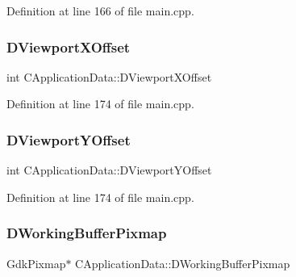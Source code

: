 Definition at line 166 of file main.\+cpp.

\hypertarget{classCApplicationData_a306bba873ccc47126111305fe21ef3ff}{}\label{classCApplicationData_a306bba873ccc47126111305fe21ef3ff} 
\subsubsection{\texorpdfstring{D\+Viewport\+X\+Offset}{DViewportXOffset}}
{\footnotesize\ttfamily int C\+Application\+Data\+::\+D\+Viewport\+X\+Offset\hspace{0.3cm}{\ttfamily [protected]}}



Definition at line 174 of file main.\+cpp.

\hypertarget{classCApplicationData_afc58ed96a1af813b28f6abf2c7d2dc72}{}\label{classCApplicationData_afc58ed96a1af813b28f6abf2c7d2dc72} 
\subsubsection{\texorpdfstring{D\+Viewport\+Y\+Offset}{DViewportYOffset}}
{\footnotesize\ttfamily int C\+Application\+Data\+::\+D\+Viewport\+Y\+Offset\hspace{0.3cm}{\ttfamily [protected]}}



Definition at line 174 of file main.\+cpp.

\hypertarget{classCApplicationData_afa34cf2780f38dd28c0c811e69d60a97}{}\label{classCApplicationData_afa34cf2780f38dd28c0c811e69d60a97} 
\subsubsection{\texorpdfstring{D\+Working\+Buffer\+Pixmap}{DWorkingBufferPixmap}}
{\footnotesize\ttfamily Gdk\+Pixmap$\ast$ C\+Application\+Data\+::\+D\+Working\+Buffer\+Pixmap\hspace{0.3cm}{\ttfamily [protected]}}



